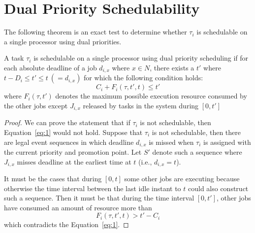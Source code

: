 \section{Dual Priority Schedulability}


The  following theorem is an exact test to  determine whether $\tau_i$ is schedulable on a single processor using dual priorities.
\begin{theorem}
\label{theorem:1}
A task $\tau_i$ is schedulable on a single processor using dual priority scheduling if  for each absolute deadline of a job  $d_{i,x}$  where $x\in N$, there exists a $t'$ where $t-D_i\leq t'\leq t~(=d_{i,x})$ for which the following condition holds: 
\begin{equation}
\label{eq:1}
C_i+F_i(\tau,t',t)\leq t'
\end{equation} 
where $F_i(\tau,t')$ denotes the maximum possible execution resource consumed by  the other jobs except $J_{i,x}$  released by tasks in the system   during $[0,t']$
\end{theorem}
\begin{proof}
We can prove the statement that if $\tau_i$ is not schedulable, then Equation~\ref{eq:1} would not hold. Suppose that $\tau_i$ is not schedulable, then there are legal event sequences in which deadline $d_{i,x}$ is missed when $\tau_i$ is assigned with the current priority and promotion point. Let $S'$ denote such a sequence where $J_{i,x}$ misses deadline at the earliest time at $t$ (i.e., $d_{i,x}=t$). 

It must be the cases that during $[0,t]$ some other jobs are executing because otherwise the time interval between the last idle instant to $t$ could also construct such a sequence. Then it must be that during the time interval $[0,t']$, other jobs have consumed an amount of resource more than 
\[
F_i(\tau,t',t)>t'-C_i
\]
which contradicts the Equation~\ref{eq:1}.
\end{proof}

